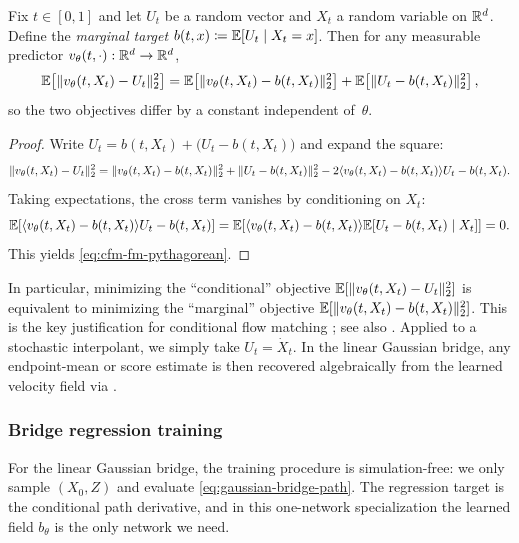 \begin{proposition}
\label{prop:cfm-vs-fm-squared-loss}
Fix $t\in[0,1]$ and let $U_t$ be a random vector and $X_t$ a random variable on $\mathbb{R}^d$.
Define the \emph{marginal target} $b(t,x)\coloneqq\mathbb{E}[U_t\mid X_t=x]$.
Then for any measurable predictor $v_\theta(t,\cdot):\mathbb{R}^d\to\mathbb{R}^d$,
\begin{equation}
  \mathbb{E}\!\left[\lVert v_\theta(t,X_t)-U_t\rVert_2^2\right]
  =
  \mathbb{E}\!\left[\lVert v_\theta(t,X_t)-b(t,X_t)\rVert_2^2\right]
  +
  \mathbb{E}\!\left[\lVert U_t-b(t,X_t)\rVert_2^2\right],
  \label{eq:cfm-fm-pythagorean}
\end{equation}
so the two objectives differ by a constant independent of~$\theta$.
\end{proposition}
\begin{proof}
Write $U_t=b(t,X_t)+\bigl(U_t-b(t,X_t)\bigr)$ and expand the square:
\[
  \lVert v_\theta(t,X_t)-U_t\rVert_2^2
  =
  \lVert v_\theta(t,X_t)-b(t,X_t)\rVert_2^2
  +
  \lVert U_t-b(t,X_t)\rVert_2^2
  -2\langle v_\theta(t,X_t)-b(t,X_t)\rangle{U_t-b(t,X_t)}.
\]
Taking expectations, the cross term vanishes by conditioning on $X_t$:
\[
  \mathbb{E}\!\left[\langle v_\theta(t,X_t)-b(t,X_t)\rangle{U_t-b(t,X_t)}\right]
  =
  \mathbb{E}\!\left[\langle v_\theta(t,X_t)-b(t,X_t)\rangle{\mathbb{E}[U_t-b(t,X_t)\mid X_t]}\right]=0.
\]
This yields \eqref{eq:cfm-fm-pythagorean}.
\end{proof}

In particular, minimizing the ``conditional'' objective $\mathbb{E}[\lVert v_\theta(t,X_t)-U_t\rVert_2^2]$ is equivalent to minimizing the ``marginal'' objective $\mathbb{E}[\lVert v_\theta(t,X_t)-b(t,X_t)\rVert_2^2]$.
This is the key justification for conditional flow matching \citep[Thm.~2]{lipman_chen_ben_hamu_nickel_le_2023_flow_matching}; see also \citet[Thm.~12]{holderrieth_erives_2026_intro_flow_matching}.
Applied to a stochastic interpolant, we simply take $U_t=\dot X_t$.
In the linear Gaussian bridge, any endpoint-mean or score estimate is then recovered algebraically from the learned velocity field via .

\subsubsection{Bridge regression training}
\label{subsubsec:diffusion-training-sampling}

For the linear Gaussian bridge, the training procedure is simulation-free: we only sample \((X_0,Z)\) and evaluate \eqref{eq:gaussian-bridge-path}.
The regression target is the conditional path derivative, and in this one-network specialization the learned field \(b_\theta\) is the only network we need.

